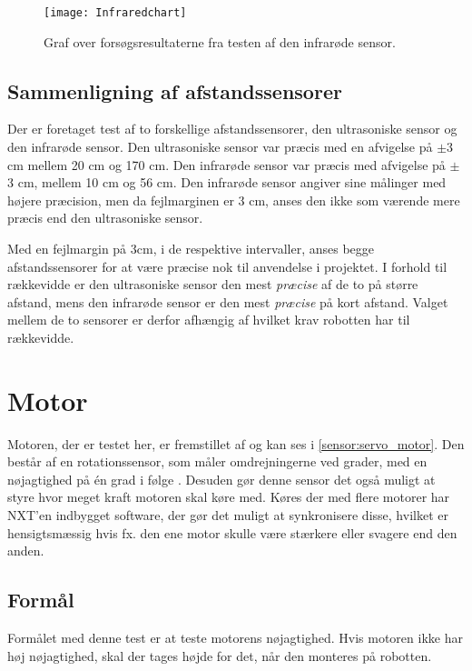 \begin{figure}[h]
\texttt{[image: Infraredchart]}
\caption{Graf over forsøgsresultaterne fra testen af den infrarøde sensor.}
\label{sensor:infrared_chart}
\end{figure}

\subsection{Sammenligning af afstandssensorer}\label{sensor:sammenligningIRvsSonar}

Der er foretaget test af to forskellige afstandssensorer, den ultrasoniske sensor og den infrarøde sensor. 
Den ultrasoniske sensor var præcis med en afvigelse på $\pm$3 cm mellem 20 cm og 170 cm.
Den infrarøde sensor var præcis med afvigelse på $\pm$3 cm, mellem 10 cm og 56 cm.
Den infrarøde sensor angiver sine målinger med højere præcision, men da fejlmarginen er 3 cm, anses den ikke som værende mere præcis end den ultrasoniske sensor.

Med en fejlmargin på 3cm, i de respektive intervaller, anses begge afstandssensorer for at være præcise nok til anvendelse i projektet.
I forhold til rækkevidde er den ultrasoniske sensor den mest \textit{præcise} af de to på større afstand, mens den infrarøde sensor er den mest \textit{præcise} på kort afstand.
Valget mellem de to sensorer er derfor afhængig af hvilket krav robotten har til rækkevidde.

\section{Motor}\label{sensorer:motorer}
Motoren, der er testet her, er fremstillet af \lego og kan ses i \cref{sensor:servo_motor}.
Den består af en rotationssensor, som måler omdrejningerne ved grader, med en nøjagtighed på \'en grad i følge \lego. 
Desuden gør denne sensor det også muligt at styre hvor meget kraft motoren skal køre med.
Køres der med flere motorer har NXT'en indbygget software, der gør det muligt at synkronisere disse, hvilket er hensigtsmæssig hvis fx. den ene motor skulle være stærkere eller svagere end den anden.\cite{tikNXT}

\subsection{Formål}
Formålet med denne test er at teste motorens nøjagtighed.
Hvis motoren ikke har høj nøjagtighed, skal der tages højde for det, når den monteres på robotten.

